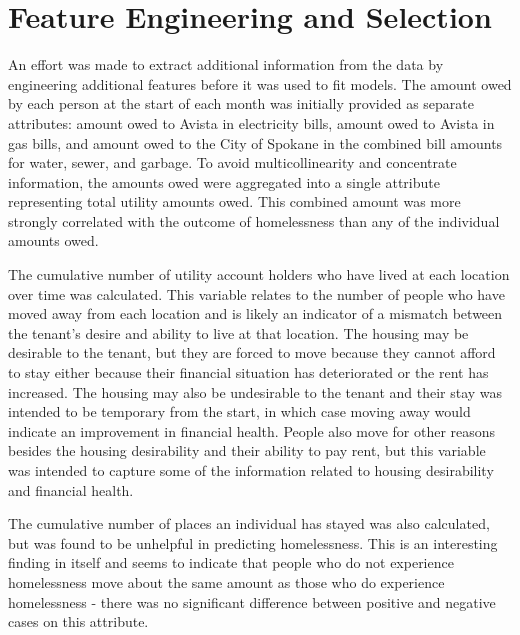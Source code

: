 \documentclass[12pt]{report}
\begin{document}
\section{Feature Engineering and Selection}
An effort was made to extract additional information from the data by engineering additional features before it was used to fit models. The amount owed by each person at the start of each month was initially provided as separate attributes: amount owed to Avista in electricity bills, amount owed to Avista in gas bills, and amount owed to the City of Spokane in the combined bill amounts for water, sewer, and garbage. To avoid multicollinearity and concentrate information, the amounts owed were aggregated into a single attribute representing total utility amounts owed. This combined amount was more strongly correlated with the outcome of homelessness than any of the individual amounts owed.

The cumulative number of utility account holders who have lived at each location over time was calculated. This variable relates to the number of people who have moved away from each location and is likely an indicator of a mismatch between the tenant's desire and ability to live at that location. The housing may be desirable to the tenant, but they are forced to move because they cannot afford to stay either because their financial situation has deteriorated or the rent has increased. The housing may also be undesirable to the tenant and their stay was intended to be temporary from the start, in which case moving away would indicate an improvement in financial health. People also move for other reasons besides the housing desirability and their ability to pay rent, but this variable was intended to capture some of the information related to housing desirability and financial health.

The cumulative number of places an individual has stayed was also calculated, but was found to be unhelpful in predicting homelessness. This is an interesting finding in itself and seems to indicate that people who do not experience homelessness move about the same amount as those who do experience homelessness - there was no significant difference between positive and negative cases on this attribute.
\end{document}
